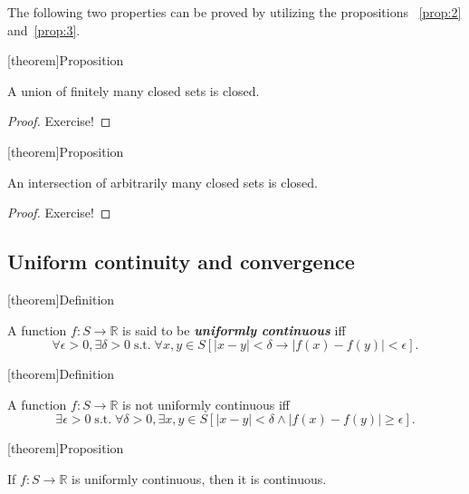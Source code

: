 \documentclass[12pt]{report}
\theoremstyle{definition}
\begin{document}
The following two properties can be proved by utilizing the propositions%
~\ref{prop:2} and~\ref{prop:3}.

[theorem]{Proposition}
\begin{union of finite closed sets is closed}
    A union of finitely many closed sets is closed.
\end{union of finite closed sets is closed}

\begin{proof}
    Exercise!
\end{proof} 

[theorem]{Proposition}
\begin{intersection of closed sets is closed}
    An intersection of arbitrarily many closed sets is closed.
\end{intersection of closed sets is closed}

\begin{proof}
    Exercise!
\end{proof} 


\subsection{Uniform continuity and convergence}\label{sec:uniform_continuity}

[theorem]{Definition}
\begin{uniformly continuous}
    A function $f:S\rightarrow\mathbb{R}$ is said to be \textbf{\emph{uniformly
    continuous}} iff \[
        \forall \epsilon > 0, \exists \delta > 0 \;\text{s.t.}\;
        \forall x,y\in S [|x-y|<\delta \rightarrow |f(x)-f(y)|<\epsilon].
    \]
\end{uniformly continuous}

[theorem]{Definition}
\begin{not uniformly continuous}
    A function $f:S\rightarrow\mathbb{R}$ is not uniformly continuous iff \[
        \exists \epsilon > 0 \;\text{s.t.}\; \forall \delta > 0,
        \exists x,y\in S [|x-y|<\delta \wedge |f(x)-f(y)|\ge\epsilon].
    \]
\end{not uniformly continuous}


[theorem]{Proposition}
\begin{uniformly continuous is continuous}
    If $f:S\rightarrow\mathbb{R}$ is uniformly continuous, 
    then it is continuous.
\end{uniformly continuous is continuous}
\end{document}
